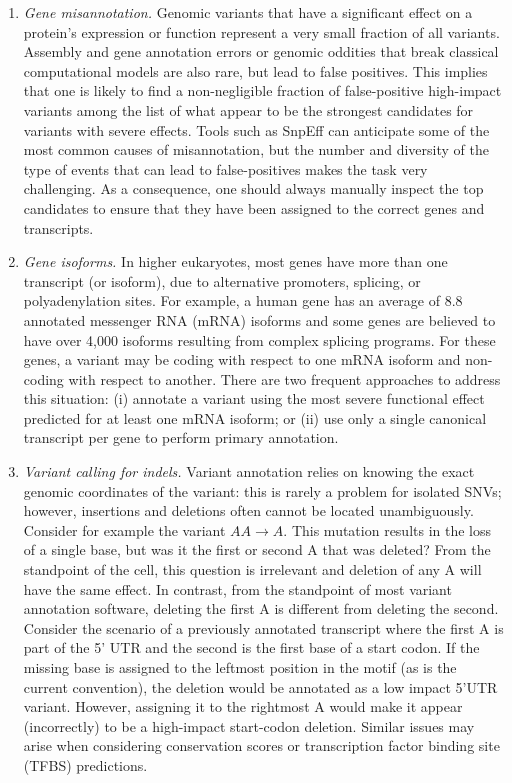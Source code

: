 \begin{enumerate}[label=\roman*]
	
	\item \textit{Gene misannotation.} Genomic variants that have a significant effect on a protein's expression or function represent a very small fraction of all variants. Assembly and gene annotation errors or genomic oddities that break classical computational models are also rare, but lead to false positives. This implies that one is likely to find a non-negligible fraction of false-positive high-impact variants among the list of what appear to be the strongest candidates for variants with severe effects. Tools such as SnpEff can anticipate some of the most common causes of misannotation, but the number and diversity of the type of events that can lead to false-positives makes the task very challenging. As a consequence, one should always manually inspect the top candidates to ensure that they have been assigned to the correct genes and transcripts.
	
	\item \textit{Gene isoforms.} In higher eukaryotes, most genes have more than one transcript (or isoform), due to alternative promoters, splicing, or polyadenylation sites. For example, a human gene has an average of 8.8 annotated messenger RNA (mRNA) isoforms and some genes are believed to have over 4,000 isoforms resulting from complex splicing programs. For these genes, a variant may be coding with respect to one mRNA isoform and non-coding with respect to another. There are two frequent approaches to address this situation: (i) annotate a variant using the most severe functional effect predicted for at least one mRNA isoform; or (ii) use only a single canonical transcript per gene to perform primary annotation. 
	
	\item \textit{Variant calling for indels.} Variant annotation relies on knowing the exact genomic coordinates of the variant: this is rarely a problem for isolated SNVs; however, insertions and deletions often cannot be located unambiguously. Consider for example the variant $AA \rightarrow A$. This mutation results in the loss of a single base, but was it the first or second A that was deleted? From the standpoint of the cell, this question is irrelevant and deletion of any A will have the same effect. In contrast, from the standpoint of most variant annotation software, deleting the first A is different from deleting the second. Consider the scenario of a previously annotated transcript where the first A is part of the 5' UTR and the second is the first base of a start codon. If the missing base is assigned to the leftmost position in the motif (as is the current convention), the deletion would be annotated as a low impact 5'UTR variant. However, assigning it to the rightmost A would make it appear (incorrectly) to be a high-impact start-codon deletion. Similar issues may arise when considering conservation scores or transcription factor binding site (TFBS) predictions.
	
\end{enumerate}


